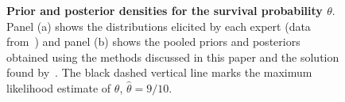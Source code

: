 \documentclass[a4paper, notitlepage, 10pt]{article}
\begin{document}
\begin{figure}[!ht]
\begin{center}
\end{center}
\caption{\textbf{Prior and posterior densities for the survival probability $\theta$}.
Panel (a) shows the distributions elicited by each expert (data from~\cite{Savchuk1994}) and panel (b) shows the pooled priors and posteriors obtained using the methods discussed in this paper and the solution found by~\cite{Rufo2012B}.
The black dashed vertical line marks the maximum likelihood estimate of $\theta$, $\hat{\theta}= 9/10$.
}
\label{fig:priors_pooled_Savchuk}
\end{figure}
\end{document}
